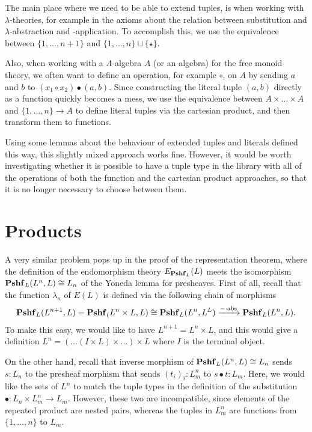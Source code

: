 The main place where we need to be able to extend tuples, is when working with $ \lambda $-theories, for example in the axioms about the relation between substitution and $ \lambda $-abstraction and -application. To accomplish this, we use the equivalence between $ \{ 1, \dots, n + 1 \} $ and $ \{ 1, \dots, n \} \sqcup \{ \star \} $.

Also, when working with a $ \Lambda $-algebra $ A $ (or an algebra) for the free monoid theory, we often want to define an operation, for example $ \circ $, on $ A $ by sending $ a $ and $ b $ to $ (x_1 \circ x_2) \bullet (a, b) $. Since constructing the literal tuple $ (a, b) $ directly as a function quickly becomes a mess, we use the equivalence between $ A \times \dots \times A $ and $ \{ 1, \dots, n \} \to A $ to define literal tuples via the cartesian product, and then transform them to functions.

Using some lemmas about the behaviour of extended tuples and literals defined this way, this slightly mixed approach works fine. However, it would be worth investigating whether it is possible to have a tuple type in the library with all of the operations of both the function and the cartesian product approaches, so that it is no longer necessary to choose between them.

\section{Products}
A very similar problem pops up in the proof of the representation theorem, where the definition of the endomorphism theory $ E_{\mathbf{Pshf}_{L}}(L) $ meets the isomorphism $ \mathbf{Pshf}_{L}(L^n, L) \cong L_n $ of the Yoneda lemma for presheaves. First of all, recall that the function $ \lambda_n $ of $ E(L) $ is defined via the following chain of morphisms
\[ \mathbf{Pshf}_{L}(L^{n + 1}, L) = \mathbf{Pshf}_{(}L^n \times L, L) \cong \mathbf{Pshf}_{L}(L^n, L^L) \xrightarrow{- \cdot \text{abs}} \mathbf{Pshf}_{L}(L^n, L). \]
To make this easy, we would like to have $ L^{n + 1} = L^n \times L $, and this would give a definition $ L^n = ( \dots (I \times L) \times \dots) \times L $ where $ I $ is the terminal object.

On the other hand, recall that inverse morphism of $ \mathbf{Pshf}_{L}(L^n, L) \cong L_n $ sends $ s: L_n $ to the presheaf morphism that sends $ (t_i)_i : L^n_m $ to $ s \bullet t : L_m $. Here, we would like the sets of $ L^n $ to match the tuple types in the definition of the substitution $ \bullet : L_n \times L_m^n \to L_m $. However, these two are incompatible, since elements of the repeated product are nested pairs, whereas the tuples in $ L_m^n $ are functions from $ \{ 1, \dots, n \} $ to $ L_m $.

